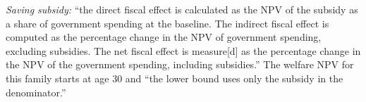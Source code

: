\begin{table}[!t]
\begin{threeparttable}
\begin{tablenotes}[flushleft]
\emph{Saving subsidy:} ``the direct fiscal effect is calculated as the NPV of the subsidy as a share of government spending at the baseline. The indirect fiscal effect is computed as the percentage change in the NPV of government spending, excluding subsidies. The net fiscal effect is measure[d] as the percentage change in the NPV of the government spending, including subsidies.'' The welfare NPV for this family starts at age 30 and ``the lower bound uses only the subsidy in the denominator.''
\end{tablenotes}
\end{threeparttable}
\end{table}
